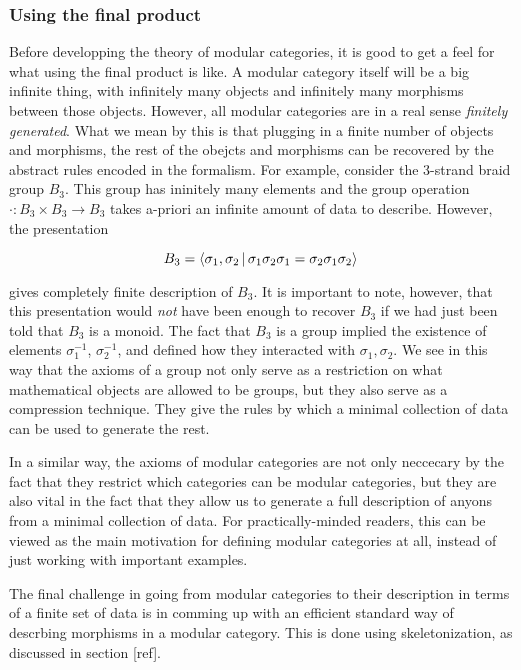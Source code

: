\subsubsection{Using the final product}

Before developping the theory of modular categories, it is good to get a feel for what using the final product is like. A modular category itself will be a big infinite thing, with infinitely many objects and infinitely many morphisms between those objects. However, all modular categories are in a real sense \textit{finitely generated}. What we mean by this is that plugging in a finite number of objects and morphisms, the rest of the obejcts and morphisms can be recovered by the abstract rules encoded in the formalism. For example, consider the 3-strand braid group $B_3$. This group has ininitely many elements and the group operation $\cdot: B_3\times B_3\to B_3$ takes a-priori an infinite amount of data to describe. However, the presentation

$$B_3=\Braket{\sigma_1, \sigma_2 | \sigma_1 \sigma_2 \sigma_1 = \sigma_2 \sigma_1 \sigma_2}$$

gives  completely finite description of $B_3$. It is important to note, however, that this presentation would \textit{not} have been enough to recover $B_3$ if we had just been told that $B_3$ is a monoid. The fact that $B_3$ is a group implied the existence of elements $\sigma_1^{-1}$, $\sigma_{2}^{-1}$, and defined how they interacted with $\sigma_1,\sigma_2$. We see in this way that the axioms of a group not only serve as a restriction on what mathematical objects are allowed to be groups, but they also serve as a compression technique. They give the rules by which a minimal collection of data can be used to generate the rest.

In a similar way, the axioms of modular categories are not only neccecary by the fact that they restrict which categories can be modular categories, but they are also vital in the fact that they allow us to generate a full description of anyons from a minimal collection of data. For practically-minded readers, this can be viewed as the main motivation for defining modular categories at all, instead of just working with important examples.

The final challenge in going from modular categories to their description in terms of a finite set of data is in comming up with an efficient standard way of descrbing morphisms in a modular category. This is done using skeletonization, as discussed in section [ref].

